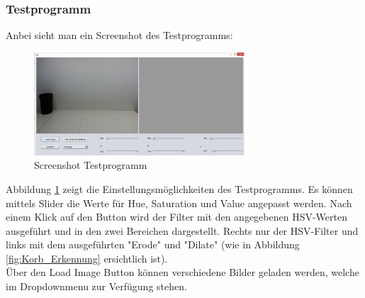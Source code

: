 \subsubsection{Testprogramm}
Anbei sieht man ein Screenshot des Testprogramms:
\begin{figure}[h!]
    \centering
    \includegraphics[width=0.7\textwidth]{fig/Testprogramm.png}
    \caption{Screenshot Testprogramm}
    \label{fig:Korb_Testprogramm}
\end{figure}

Abbildung \ref{fig:Korb_Testprogramm} zeigt die Einstellungsmöglichkeiten des 
Testprogramms. Es können mittels Slider die Werte für Hue, Saturation und 
Value angepasst werden. Nach einem Klick auf den Button wird der Filter mit 
den angegebenen HSV-Werten ausgeführt und in den zwei Bereichen dargestellt. 
Rechts nur der HSV-Filter und links mit dem ausgeführten "{}Erode"{} und "{}Dilate"{} (wie in Abbildung 
\ref{fig:Korb_Erkennung} ersichtlich ist). \\
Über den Load Image Button können verschiedene Bilder geladen werden, welche 
im Dropdownmenu zur Verfügung stehen.
